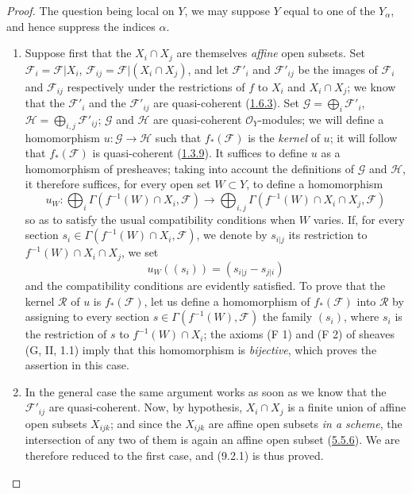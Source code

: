 \begin{proof}
The question being local on $Y$, we may suppose $Y$ equal to one of the
$Y_\alpha$, and hence suppress the indices $\alpha$.

\begin{enumerate}
\item[a)] Suppose first that the $X_i\cap X_j$ are themselves
\emph{affine} open subsets. Set
$\mathscr{F}_i=\mathscr{F}|X_i$,
$\mathscr{F}_{ij}=\mathscr{F}|(X_i\cap X_j)$, and let
$\mathscr{F}'_i$ and $\mathscr{F}'_{ij}$ be the images of $\mathscr{F}_i$
and $\mathscr{F}_{ij}$ respectively under the restrictions of $f$ to $X_i$
and $X_i\cap X_j$; we know that the $\mathscr{F}'_i$ and the
$\mathscr{F}'_{ij}$ are quasi-coherent
(\hyperref[I.1.6.3]{1.6.3}). Set
$\mathscr{G}=\bigoplus_i\mathscr{F}'_i$,
$\mathscr{H}=\bigoplus_{i,j}\mathscr{F}'_{ij}$; $\mathscr{G}$ and
$\mathscr{H}$ are quasi-coherent $\mathscr{O}_Y$-modules; we will
define a homomorphism $u:\mathscr{G}\to\mathscr{H}$ such that
$f_*(\mathscr{F})$ is the \emph{kernel} of $u$; it will follow that
$f_*(\mathscr{F})$ is quasi-coherent
(\hyperref[I.1.3.9]{1.3.9}). It suffices to define $u$
as a homomorphism of presheaves; taking into account the definitions of
$\mathscr{G}$ and $\mathscr{H}$, it therefore suffices, for every open set
$W\subset Y$, to define a homomorphism
\[
  u_W:\bigoplus_i\Gamma(f^{-1}(W)\cap X_i,\mathscr{F})
  \longrightarrow
  \bigoplus_{i,j}\Gamma(f^{-1}(W)\cap X_i\cap X_j,\mathscr{F})
\]
so as to satisfy the usual compatibility conditions when $W$
varies. If, for every section
$s_i\in\Gamma(f^{-1}(W)\cap X_i,\mathscr{F})$, we denote by $s_{i|j}$ its
restriction to $f^{-1}(W)\cap X_i\cap X_j$, we set
\[
  u_W((s_i))=(s_{i|j}-s_{j|i})
\]
and the compatibility conditions are evidently satisfied. To
prove that the kernel $\mathscr{R}$ of $u$ is $f_*(\mathscr{F})$, let us
define a homomorphism of $f_*(\mathscr{F})$ into $\mathscr{R}$ by assigning
to every section $s\in\Gamma(f^{-1}(W),\mathscr{F})$ the family
$(s_i)$, where $s_i$ is the restriction of $s$ to $f^{-1}(W)\cap X_i$; the
axioms (F 1) and (F 2) of sheaves (G, II, 1.1) imply that this
homomorphism is \emph{bijective}, which proves the assertion in this case.

\item[b)] In the general case the same argument works as soon as we know that the $\mathscr{F}'_{ij}$ are quasi-coherent. Now, by
hypothesis, $X_i\cap X_j$ is a finite union of affine open subsets
$X_{ijk}$; and since the $X_{ijk}$ are affine open subsets \emph{in a
scheme}, the intersection of any two of them is again an affine open subset
(\hyperref[I.5.5.6]{5.5.6}). We are therefore reduced to the first case,
and (9.2.1) is thus proved.
\end{enumerate}
\end{proof}


